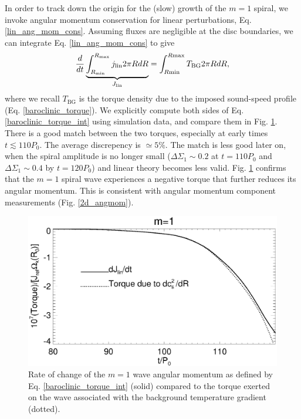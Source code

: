 In order to track down the origin for the (slow) growth of the
$m=1$ spiral, we invoke angular momentum conservation for linear
perturbations, Eq. \ref{lin_ang_mom_cons}. Assuming fluxes are
negligible at the disc boundaries, we can integrate
Eq. \ref{lin_ang_mom_cons} to give
\begin{align}\label{baroclinic_torque_int}
  \frac{d}{dt}\underbrace{\int_{R_\mathrm{min}}^{R_\mathrm{max}}j_\mathrm{lin}
    2\pi R dR}_{J_\mathrm{lin}} 
  =\int_{R\mathrm{min}}^{R\mathrm{max}}T_\mathrm{BG} 2\pi R dR, 
\end{align}
where we recall $T_\mathrm{BG}$ is the torque density due to the imposed
sound-speed profile (Eq. \ref{baroclinic_torque}). We explicitly 
compute both sides of Eq. \ref{baroclinic_torque_int} using
simulation data, and compare them in Fig. \ref{fargo_angmom_ex}. There
is a good match between the two torques, especially at early times
$t\lesssim110P_0$. The average discrepency is $\simeq 5\%$. 
The match is less good later on, when the spiral
amplitude is no longer small ($\Delta\Sigma_1\sim 0.2$ at $t=110P_0$
and $\Delta\Sigma_1\sim 0.4$ by $t=120P_0$) and linear theory becomes
less valid. Fig. \ref{fargo_angmom_ex} confirms that the $m=1$ spiral
wave experiences a negative torque that further reduces its angular
momentum. This is consistent with angular momentum component
measurements (Fig. \ref {2d_angmom}).  


\begin{figure}
  \includegraphics[width=\linewidth]{figures/m1_analysis_ang_fargo.ps} 
  \caption{Rate of change of the $m=1$ wave angular momentum as defined by
    Eq. \ref{baroclinic_torque_int} (solid) compared to the torque
    exerted on the wave associated with the background temperature
    gradient (dotted). 
    \label{fargo_angmom_ex}} 
\end{figure}

